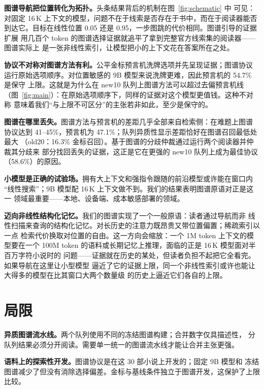 \documentclass[UTF8,11pt]{ctexart}
\begin{document}
\textbf{图谱导航把位置转化为拓扑。}头条结果背后的机制在图~\ref{fig:schematic} 中
可见：对固定 16\,K 上下文的模型，问题不在于线索是否存在于书中，而在于阅读器能否
到达它。目标在线性位置 0.05 还是 0.95，一步图跳的代价相同。图谱引导的证据扩展
用几百个 token 的图谱选择证据就追平了拿到完整官方线索集的阅读器——图谱实际上
是一张非线性索引，让模型把小的上下文花在答案所在之处。

\textbf{协议不对称对图谱方法有利。}公平金标预言机洗牌选项并先呈现证据；图谱协议
运行原始选项顺序。对位置敏感的 9B 模型来说洗牌更难，因此预言机的 54.7\% 是保守
上限。这就是为什么在 new10 队列上图谱方法可以超过去偏预言机线
（图~\ref{fig:main}）：在原始选项顺序下，同样的证据对这个模型更值钱。这种不对称
意味着我们``与上限不可区分''的主张若非如此，至少是保守的。

\textbf{图谱在哪里丢失。}图谱方法与预言机的差距几乎全部来自检索侧：在难题上图谱
协议达到 41--45\%，预言机为 47.1\%；队列异质性显示差距恰好在图谱召回最低处最大
（old20：16.3\% 金标召回）。基于图谱的分歧仲裁通过运行两个阅读器并仲裁其分歧来
部分找回丢失的证据，这正是它在更强的 new10 队列上成为最佳协议（58.6\%）的原因。

\textbf{小模型是正确的试验场。}拥有大上下文和强指令跟随的前沿模型或许能在窗口内
``线性搜索''；9B 模型配 16\,K 上下文做不到。我们的结果表明图谱原语对正是这一
领域最重要——本地、设备端、成本敏感部署的领域。

\textbf{迈向非线性结构化记忆。}我们的图谱实现了一个一般原语：读者通过导航而非
线性扫描来查询的结构化记忆。对长历史的注意力既昂贵又带位置偏置；稀疏索引以一点
检索代价换取对位置的自由。这一方向会缩放：一个 1M token 上下文的模型要在一个
100M token 的语料或长期记忆上推理，面临的正是 16\,K 模型面对半百万字符小说时的
问题——证据就在历史的某处，但读者负担不起把它全看完。如果导航在这里让小型模型
逼近了它的证据上限，同一个非线性索引或许也能让大得多的模型在比其窗口大两个数量级
的历史上逼近它们各自的上限。

\section{局限}
\label{sec:limitations}

\textbf{异质图谱流水线。}两个队列使用不同的冻结图谱构建；合并数字仅具描述性，
分队列结果必须分开阅读。需要单一统一的图谱流水线才能让合并主张更强。

\textbf{语料上的探索性开发。}图谱协议是在这 30 部小说上开发的；固定 9B 模型和
冻结图谱减少了但没有消除选择偏差。金标与基线条件独立于图谱开发，这保护了上限
比较。
\end{document}
